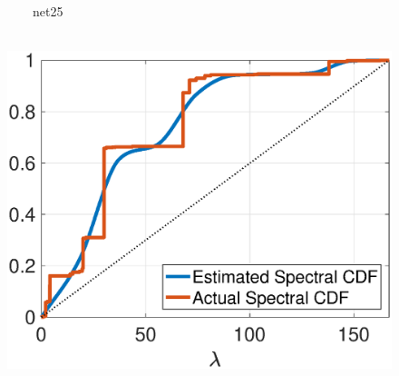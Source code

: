 \documentclass{article}
\begin{document}
\begin{figure}[bt]
\begin{minipage}[m]{0.32\linewidth}
\centerline{\small{~~~~net25}}
\centerline{~~\includegraphics[width=1.1\linewidth]{fig_net25_cdf}}
\end{minipage}
\\
\vspace{0.03\linewidth}



\end{figure}
\end{document}
